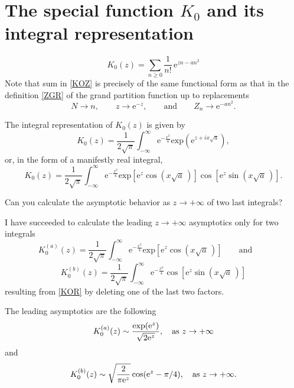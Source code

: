 \documentclass[12pt]{article}
\numberwithin{equation}{section}
\newcommand{\be}{\begin{equation}}
\newcommand{\ee}{\end{equation}}
\newcommand{\e}{\mbox{e}}
\newcommand {\MM}[1]{\qquad\mbox{#1}\qquad}
\begin{document}
  
	\pagebreak
	\section{The special function $K_0$ and its integral representation}
	
	\be\label{KOZ}
	K_0(z)=\sum_{n\ge0}\frac1{n!}\,\e^{zn-an^2}
	\ee
	Note that sum in \eqref{KOZ} is precisely of the same functional form as that in the definition \eqref{ZGR} of the grand partition function up to replacements
	\be
	N\to n,\qquad z\to\e^{-z},\MM{and}Z_n\to\e^{-an^2}.
	\ee
	
	The integral representation of $K_0(z)$ is given by
	\be
	K_0(z)=\frac1{2\sqrt\pi}\int_{-\infty}^\infty\e^{-\frac{x^2}4}
	\mbox{exp}\left(\e^{z+ix\sqrt a}\right),
	\ee
	or, in the form of a manifestly real integral,
	\be\label{KOR}
	K_0(z)=\frac1{2\sqrt\pi}\int_{-\infty}^\infty\e^{-\frac{x^2}4}
	\mbox{exp}\left[\e^z\cos(x\sqrt a\,)\right]
	\cos\left[\e^z\sin(x\sqrt a\,)\right].
	\ee
	
	Can you calculate the asymptotic behavior as $z\to+\infty$ of two last integrals?
	
	I have succeeded to calculate the leading $z\to+\infty$ asymptotics only for two integrals
	\be
	K_0^{(a)}(z) = \frac1{2\sqrt\pi} \int_{-\infty}^\infty\e^{-\frac{x^2}4}
	\mbox{exp}\left[\e^z\cos(x\sqrt a\,)\right]\qquad\mbox{and}\qquad
	\ee
	\be
	K_0^{(b)}(z) = \frac1{2\sqrt\pi} \int_{-\infty}^\infty\e^{-\frac{x^2}4}
	\cos\left[\e^z\sin(x\sqrt a\,)\right]
	\ee
	resulting from \eqref{KOR} by deleting one of the last two factors.
	
	The leading asymptotics are the following
	\begin{equation}
		K_0^{(a)}(z) \sim \frac{\exp({\rm e}^z)}{\sqrt{2 {\rm e}^z}}, \quad \text{as } z \to +\infty
	\end{equation}
	and
	\begin{equation}
		K_0^{(b)}(z) \sim \sqrt{\frac{2}{\pi {\rm e}^z}} \cos({\rm e}^z - \pi/4), \quad \text{as } z \to +\infty.
	\end{equation}

	\appendix
	
\end{document}
